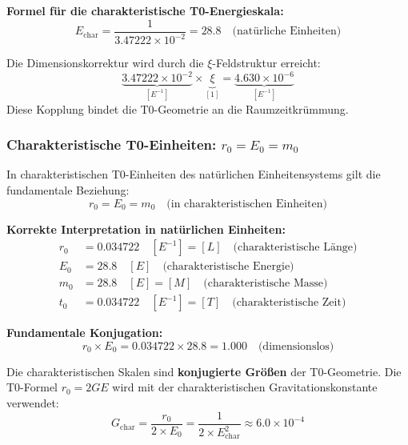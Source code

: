 	\textbf{Formel für die charakteristische T0-Energieskala:}
	\begin{equation}
		\boxed{E_{\text{char}} = \frac{1}{3.47222 \times 10^{-2}} = 28.8 \quad \text{(natürliche Einheiten)}}
	\end{equation}
	
	Die Dimensionskorrektur wird durch die $\xi$-Feldstruktur erreicht:
	\begin{equation}
		\underbrace{3.47222 \times 10^{-2}}_{[E^{-1}]} \times \underbrace{\xi}_{[1]} = \underbrace{4.630 \times 10^{-6}}_{[E^{-1}]}
	\end{equation}
	Diese Kopplung bindet die T0-Geometrie an die Raumzeitkrümmung.
	
	\subsubsection{Charakteristische T0-Einheiten: $r_0 = E_0 = m_0$}
	
	In charakteristischen T0-Einheiten des natürlichen Einheitensystems gilt die fundamentale Beziehung:
	\begin{equation}
		r_0 = E_0 = m_0 \quad \text{(in charakteristischen Einheiten)}
	\end{equation}
	
	\textbf{Korrekte Interpretation in natürlichen Einheiten:}
	\begin{align}
		r_0 &= 0.034722 \quad [E^{-1}] = [L] \quad \text{(charakteristische Länge)} \\
		E_0 &= 28.8 \quad [E] \quad \text{(charakteristische Energie)} \\
		m_0 &= 28.8 \quad [E] = [M] \quad \text{(charakteristische Masse)} \\
		t_0 &= 0.034722 \quad [E^{-1}] = [T] \quad \text{(charakteristische Zeit)}
	\end{align}
	
	\textbf{Fundamentale Konjugation:}
	\begin{equation}
		r_0 \times E_0 = 0.034722 \times 28.8 = 1.000 \quad \text{(dimensionslos)}
	\end{equation}
	
	Die charakteristischen Skalen sind \textbf{konjugierte Größen} der T0-Geometrie. Die T0-Formel $r_0 = 2GE$ wird mit der charakteristischen Gravitationskonstante verwendet:
	\begin{equation}
		G_{\text{char}} = \frac{r_0}{2 \times E_0} = \frac{1}{2 \times E_{\text{char}}^2} \approx 6.0 \times 10^{-4}
	\end{equation}
	

